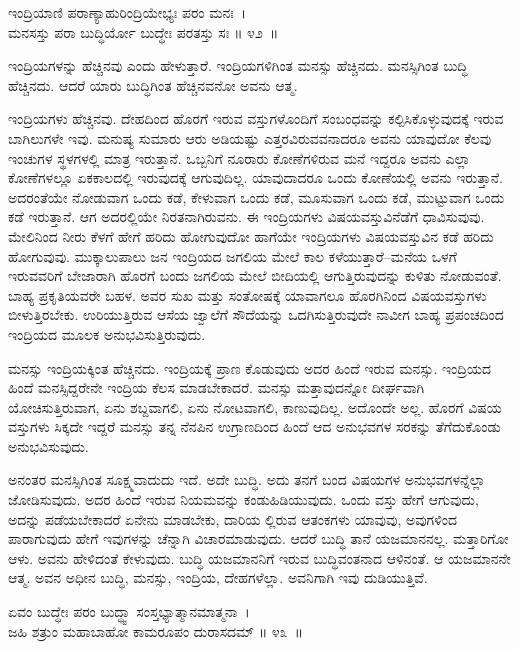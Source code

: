 \begin{shloka}
ಇಂದ್ರಿಯಾಣಿ ಪರಾಣ್ಯಾಹುರಿಂದ್ರಿಯೇಭ್ಯಃ ಪರಂ ಮನಃ~।\\ಮನಸಸ್ತು ಪರಾ ಬುದ್ಧಿರ್ಯೋ ಬುದ್ಧೇಃ ಪರತಸ್ತು ಸಃ \hfill॥ ೪೨~॥
\end{shloka}

\begin{artha}
ಇಂದ್ರಿಯಗಳನ್ನು ಹೆಚ್ಚಿನವು ಎಂದು ಹೇಳುತ್ತಾರೆ. ಇಂದ್ರಿಯಗಳಿಗಿಂತ ಮನಸ್ಸು ಹೆಚ್ಚಿನದು. ಮನಸ್ಸಿಗಿಂತ ಬುದ್ಧಿ ಹೆಚ್ಚಿನದು. ಆದರೆ ಯಾರು ಬುದ್ಧಿಗಿಂತ ಹೆಚ್ಚಿನವನೋ ಅವನು ಆತ್ಮ.
\end{artha}

ಇಂದ್ರಿಯಗಳು ಹೆಚ್ಚಿನವು. ದೇಹದಿಂದ ಹೊರಗೆ ಇರುವ ವಸ್ತುಗಳೊಂದಿಗೆ ಸಂಬಂಧವನ್ನು ಕಲ್ಪಿಸಿಕೊಳ್ಳುವುದಕ್ಕೆ ಇರುವ ಬಾಗಿಲುಗಳೇ ಇವು. ಮನುಷ್ಯ ಸುಮಾರು ಆರು ಅಡಿಯಷ್ಟು ಎತ್ತರವಿರುವವನಾದರೂ ಅವನು ಯಾವುದೋ ಕೆಲವು ಇಂಚುಗಳ ಸ್ಥಳಗಳಲ್ಲಿ ಮಾತ್ರ ಇರುತ್ತಾನೆ. ಒಬ್ಬನಿಗೆ ನೂರಾರು ಕೋಣೆಗಳಿರುವ ಮನೆ ಇದ್ದರೂ ಅವನು ಎಲ್ಲಾ ಕೋಣೆಗಳಲ್ಲೂ ಏಕಕಾಲದಲ್ಲಿ ಇರುವುದಕ್ಕೆ ಆಗುವುದಿಲ್ಲ. ಯಾವುದಾದರೂ ಒಂದು ಕೋಣೆಯಲ್ಲಿ ಅವನು ಇರುತ್ತಾನೆ. ಅದರಂತೆಯೇ ನೋಡುವಾಗ ಒಂದು ಕಡೆ, ಕೇಳುವಾಗ ಒಂದು ಕಡೆ, ಮೂಸುವಾಗ ಒಂದು ಕಡೆ, ಮುಟ್ಟುವಾಗ ಒಂದು ಕಡೆ ಇರುತ್ತಾನೆ. ಆಗ ಅದರಲ್ಲಿಯೇ ನಿರತನಾಗಿರುವನು. ಈ ಇಂದ್ರಿಯಗಳು ವಿಷಯವಸ್ತುವಿನೆಡೆಗೆ ಧಾವಿಸುವುವು. ಮೇಲಿನಿಂದ ನೀರು ಕೆಳಗೆ ಹೇಗೆ ಹರಿದು ಹೋಗುವುದೋ ಹಾಗೆಯೇ ಇಂದ್ರಿಯಗಳು ವಿಷಯವಸ್ತುವಿನ ಕಡೆ ಹರಿದು ಹೋಗುವುವು. ಮುಕ್ಕಾಲುಪಾಲು ಜನ ಇಂದ್ರಿಯದ ಜಗಲಿಯ ಮೇಲೆ ಕಾಲ ಕಳೆಯುತ್ತಾರೆ–ಮನೆಯ ಒಳಗೆ ಇರುವವರಿಗೆ ಬೇಜಾರಾಗಿ ಹೊರಗೆ ಬಂದು ಜಗಲಿಯ ಮೇಲೆ ಬೀದಿಯಲ್ಲಿ ಆಗುತ್ತಿರುವುದನ್ನು ಕುಳಿತು ನೋಡುವಂತೆ. ಬಾಹ್ಯ ಪ್ರಕೃತಿಯವರೇ ಬಹಳ. ಅವರ ಸುಖ ಮತ್ತು ಸಂತೋಷಕ್ಕೆ ಯಾವಾಗಲೂ ಹೊರಗಿನಿಂದ ವಿಷಯವಸ್ತುಗಳು ಬೀಳುತ್ತಿರಬೇಕು. ಉರಿಯುತ್ತಿರುವ ಆಸೆಯ ಜ್ವಾಲೆಗೆ ಸೌದೆಯನ್ನು ಒದಗಿಸುತ್ತಿರುವುದೇ ನಾವೀಗ ಬಾಹ್ಯ ಪ್ರಪಂಚದಿಂದ ಇಂದ್ರಿಯದ ಮೂಲಕ ಅನುಭವಿಸುತ್ತಿರುವುದು.

ಮನಸ್ಸು ಇಂದ್ರಿಯಕ್ಕಿಂತ ಹೆಚ್ಚಿನದು. ಇಂದ್ರಿಯಕ್ಕೆ ಪ್ರಾಣ ಕೊಡುವುದು ಅದರ ಹಿಂದೆ ಇರುವ ಮನಸ್ಸು. ಇಂದ್ರಿಯದ ಹಿಂದೆ ಮನಸ್ಸಿದ್ದರೇನೇ ಇಂದ್ರಿಯ ಕೆಲಸ ಮಾಡಬೇಕಾದರೆ. ಮನಸ್ಸು ಮತ್ತಾವುದನ್ನೋ ದೀರ್ಘವಾಗಿ ಯೋಚಿಸುತ್ತಿರುವಾಗ, ಏನು ಶಬ್ದವಾಗಲಿ, ಏನು ನೋಟವಾಗಲಿ, ಕಾಣುವುದಿಲ್ಲ. ಅದೊಂದೇ ಅಲ್ಲ. ಹೊರಗೆ ವಿಷಯ ವಸ್ತುಗಳು ಸಿಕ್ಕದೇ ಇದ್ದರೆ ಮನಸ್ಸು ತನ್ನ ನೆನಪಿನ ಉಗ್ರಾಣದಿಂದ ಹಿಂದೆ ಆದ ಅನುಭವಗಳ ಸರಕನ್ನು ತೆಗೆದುಕೊಂಡು ಅನುಭವಿಸುವುದು.

ಅನಂತರ ಮನಸ್ಸಿಗಿಂತ ಸೂಕ್ಷ್ಮವಾದುದು ಇದೆ. ಅದೇ ಬುದ್ಧಿ. ಅದು ತನಗೆ ಬಂದ ವಿಷಯಗಳ ಅನುಭವಗಳನ್ನೆಲ್ಲಾ ಜೋಡಿಸುವುದು. ಅದರ ಹಿಂದೆ ಇರುವ ನಿಯಮವನ್ನು ಕಂಡುಹಿಡಿಯುವುದು. ಒಂದು ವಸ್ತು ಹೇಗೆ ಆಗುವುದು, ಅದನ್ನು ಪಡೆಯಬೇಕಾದರೆ ಏನೇನು ಮಾಡಬೇಕು, ದಾರಿಯ ಲ್ಲಿರುವ ಆತಂಕಗಳು ಯಾವುವು, ಅವುಗಳಿಂದ ಪಾರಾಗುವುದು ಹೇಗೆ ಇವುಗಳನ್ನು ಚೆನ್ನಾಗಿ ವಿಚಾರಮಾಡುವುದು. ಆದರೆ ಬುದ್ಧಿ ತಾನೆ ಯಜಮಾನನಲ್ಲ. ಮತ್ತಾರಿಗೋ ಆಳು. ಅವನು ಹೇಳಿದಂತೆ ಕೇಳುವುದು. ಬುದ್ಧಿ ಯಜಮಾನನಿಗೆ ಇರುವ ಬುದ್ಧಿವಂತನಾದ ಆಳಿನಂತೆ. ಆ ಯಜಮಾನನೇ ಆತ್ಮ. ಅವನ ಅಧೀನ ಬುದ್ಧಿ, ಮನಸ್ಸು, ಇಂದ್ರಿಯ, ದೇಹಗಳೆಲ್ಲಾ. ಅವನಿಗಾಗಿ ಇವು ದುಡಿಯುತ್ತಿವೆ.

\begin{shloka}
ಏವಂ ಬುದ್ಧೇಃ ಪರಂ ಬುದ್ಧ್ವಾ ಸಂಸ್ತಭ್ಯಾತ್ಮಾನಮಾತ್ಮನಾ~।\\ಜಹಿ ಶತ್ರುಂ ಮಹಾಬಾಹೋ ಕಾಮರೂಪಂ ದುರಾಸದಮ್ \hfill॥ ೪೩~॥
\end{shloka}

